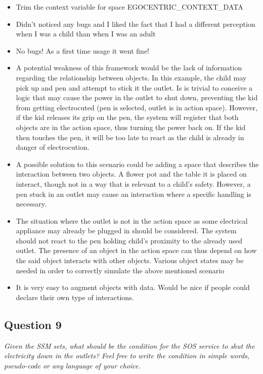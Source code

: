 \begin{itemize}
	\item Trim the context variable for space EGOCENTRIC\_CONTEXT\_DATA
	\item Didn't noticed any bugs and I liked the fact that I had a different perception when I was a child than when I was an adult
	\item No bugs! As a first time usage it went fine!
	\item A potential weakness of this framework would be the lack of information regarding the relationship between objects. In this example, the child may pick up and pen and attempt to stick it the outlet. Is is trivial to conceive a logic that may cause the power in the outlet to shut down, preventing the kid from getting electrocuted (pen is selected, outlet is in action space). However, if the kid releases its grip on the pen, the system will register that both objects are in the action space, thus turning the power back on. If the kid then touches the pen, it will be too late to react as the child is already in danger of electrocution.
	\item A possible solution to this scenario could be adding a space that describes the interaction between two objects. A flower pot and the table it is placed on interact, though not in a way that is relevant to a child's safety. However, a pen stuck in an outlet may cause an interaction where a specific handling is necessary.
	\item The situation where the outlet is not in the action space as some electrical appliance may already be plugged in should be considered. The system should not react to the pen holding child's proximity to the already used outlet. The presence of an object in the action space can thus depend on how the said object interacts with other objects. Various object states may be needed in order to correctly simulate the above mentioned scenario
	\item It is very easy to augment objects with data. Would be nice if people could declare their own type of interactions.
\end{itemize}

\subsection{Question 9}
\emph{Given the SSM sets, what should be the condition for the SOS service to shut the electricity down in the outlets? Feel free to write the condition in simple words, pseudo-code or any language of your choice.}

